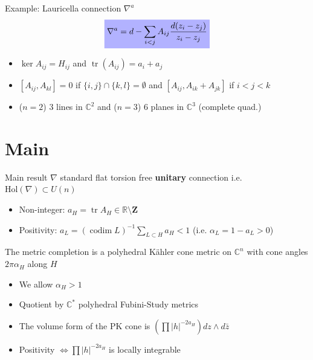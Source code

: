 \documentclass{beamer}
\newcommand{\C}{\mathbb{C}}
\newcommand{\R}{\mathbb{R}}
\DeclareMathOperator{\codim}{codim}
\DeclareMathOperator{\tr}{tr}
\newcommand{\mathcolorbox}[2]{\colorbox{#1}{$\displaystyle #2$}}
\begin{document}
\begin{frame}{Example: Lauricella connection \(\nabla^a\)}
	\[\mathcolorbox{blue!30}{
	\nabla^a = d - \sum_{i<j} A_{ij} \frac{d(z_i-z_j)}{z_i-z_j}
	} 
	\]
	\begin{itemize}
		\item \(\ker A_{ij} = H_{ij}\) and \(\tr(A_{ij})=a_i + a_j\)
		\item \([A_{ij}, A_{kl}]=0\) if \(\{i,j\}\cap\{k,l\}=\emptyset\) and \([A_{ij}, A_{ik}+A_{jk}]\) if \(i<j<k\)
		\item (\(n=2\)) \(3\) lines in \(\C^2\) and (\(n=3\)) \(6\) planes in \(\C^3\)  (complete quad.)
	\end{itemize}
\end{frame}






\section{Main}


\begin{frame}{Main result}
\(\nabla\) standard flat torsion free \textbf{unitary} connection
i.e. \(\mbox{Hol}(\nabla) \subset U(n)\)

	\begin{itemize}
		\item Non-integer: \(a_H = \tr A_H \in \R \setminus \mathbf{Z}\) 
		
		\item Positivity: \(a_L = (\codim L)^{-1} \sum_{L \subset H} a_H < 1\) (i.e. \(\alpha_L=1-a_L>0\))
	\end{itemize}

	\begin{theorem}[dB-Panov, 2021]
		The metric completion is a polyhedral K\"ahler cone metric on \(\C^n\) with cone angles \(2\pi\alpha_H\) along \(H\)
	\end{theorem}

\begin{itemize}
	\item We allow \(\alpha_H>1\)
	\item Quotient by \(\C^*\) polyhedral Fubini-Study metrics 
	\item The volume form of the PK cone is
	\(\left(\prod |h|^{-2a_H}\right) dz \wedge d \bar{z}\) 
	\item Positivity \(\iff \prod |h|^{-2a_H}\) is locally integrable
\end{itemize}

\end{frame}
\end{document}

